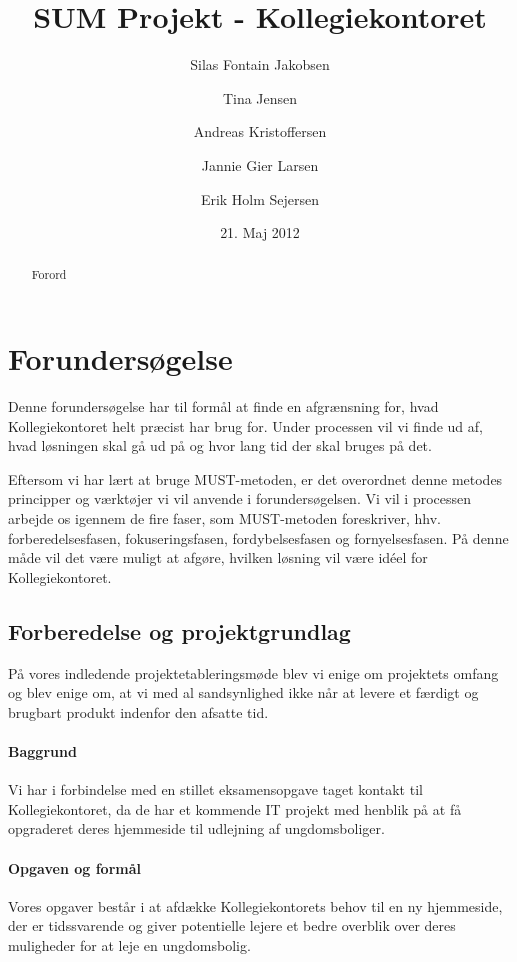 \documentclass[12pt, a4paper]{report}
\title{SUM Projekt - Kollegiekontoret}
\author{Silas Fontain Jakobsen \and Tina Jensen \and Andreas Kristoffersen \and Jannie Gier Larsen \and Erik Holm Sejersen}
\date{21. Maj 2012}
\begin{document}
\begin{titlepage}
\maketitle
\end{titlepage}

\begin{abstract}
\thispagestyle{empty}
Forord
\end{abstract}

\tableofcontents

\chapter{Forundersøgelse}

Denne forundersøgelse har til formål at finde en afgrænsning for, hvad Kollegiekontoret helt præcist har brug for. Under processen vil vi finde ud af, hvad løsningen skal gå ud på og hvor lang tid der skal bruges på det.

Eftersom vi har lært at bruge MUST-metoden, er det overordnet denne metodes principper og værktøjer vi vil anvende i forundersøgelsen. Vi vil i processen arbejde os igennem de fire faser, som MUST-metoden foreskriver, hhv. forberedelsesfasen, fokuseringsfasen, fordybelsesfasen og fornyelsesfasen. På denne måde vil det være muligt at afgøre, hvilken løsning vil være idéel for Kollegiekontoret.

\section{Forberedelse og projektgrundlag}
På vores indledende projektetableringsmøde blev vi enige om projektets omfang og blev enige om, at vi med al sandsynlighed ikke når at levere et færdigt og brugbart produkt indenfor den afsatte tid.

\subsubsection{Baggrund}
Vi har i forbindelse med en stillet eksamensopgave taget kontakt til Kollegiekontoret, da de har et kommende IT projekt med henblik på at få opgraderet deres hjemmeside til udlejning af ungdomsboliger.

\subsubsection{Opgaven og formål}
Vores opgaver består i at afdække Kollegiekontorets behov til en ny hjemmeside, der er tidssvarende og giver potentielle lejere et bedre overblik over deres muligheder for at leje en ungdomsbolig.
\end{document}
